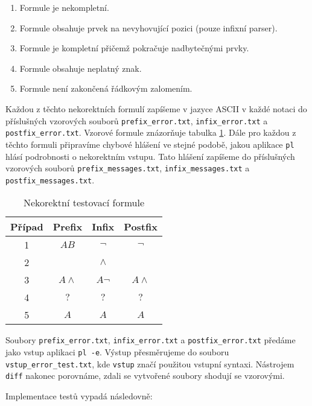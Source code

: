 \documentclass[thesis=B,czech,hidelinks]{FITthesis}[2012/06/26]
\begin{document}
\begin{enumerate}
	\item Formule je nekompletní.
	\item Formule obsahuje prvek na nevyhovující pozici (pouze infixní parser).
	\item Formule je kompletní přičemž pokračuje nadbytečnými prvky.
	\item Formule obsahuje neplatný znak.
	\item Formule není zakončená řádkovým zalomením.
\end{enumerate}

Každou z těchto nekorektních formulí zapíšeme v jazyce ASCII v každé notaci do příslušných vzorových souborů \texttt{prefix\_error.txt}, \texttt{infix\_error.txt} a \texttt{postfix\_error.txt}. Vzorové formule znázorňuje tabulka \ref{tab:test:parser:neg}. Dále pro každou z těchto formuli připravíme chybové hlášení ve stejné podobě, jakou aplikace \texttt{pl} hlásí podrobnosti o nekorektním vstupu. Tato hlášení zapíšeme do příslušných vzorových souborů \texttt{prefix\_messages.txt}, \texttt{infix\_messages.txt} a \texttt{postfix\_messages.txt}.

\begin{table}
\centering
\caption{Nekorektní testovací formule}
\label{tab:test:parser:neg}
\begin{tabular}{|c|c|c|c|}\hline
	Případ & Prefix & Infix & Postfix \tabularnewline \hline \hline
	1 & $AB$ & $\neg$ & $\neg$ \tabularnewline \hline
	2 & & $\wedge$ & \tabularnewline \hline
	3 & $A \wedge$ & $A \neg$ & $A \wedge$ \tabularnewline \hline
	4 & $?$ & $?$ & $?$ \tabularnewline \hline
	5 & $A$ & $A$ & $A$ \tabularnewline \hline
\end{tabular}
\end{table}

Soubory \texttt{prefix\_error.txt}, \texttt{infix\_error.txt} a \texttt{postfix\_error.txt} předáme jako vstup aplikaci \texttt{pl -e}. Výstup přesměrujeme do souboru \texttt{vstup\_error\_test.txt}, kde \texttt{vstup} značí použitou vstupní syntaxi. Nástrojem \texttt{diff} nakonec porovnáme, zdali se vytvořené soubory shodují se vzorovými.

Implementace testů vypadá následovně:

\begin{figure}
\centering

\end{figure}
\end{document}
